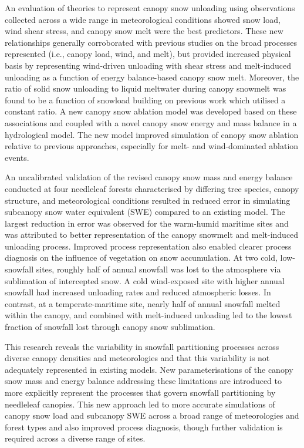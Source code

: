 {An evaluation of theories to represent canopy snow unloading using observations collected across a wide range in meteorological conditions showed snow load, wind shear stress, and canopy snow melt were the best predictors. These new relationships generally corroborated with previous studies on the broad processes represented (i.e., canopy load, wind, and melt), but provided increased physical basis by representing wind-driven unloading with shear stress and melt-induced unloading as a function of energy balance-based canopy snow melt. Moreover, the ratio of solid snow unloading to liquid meltwater during canopy snowmelt was found to be a function of snowload building on previous work which utilised a constant ratio. A new canopy snow ablation model was developed based on these associations and coupled with a novel canopy snow energy and mass balance in a hydrological model. The new model improved simulation of canopy snow ablation relative to previous approaches, especially for melt- and wind-dominated ablation events.

An uncalibrated validation of the revised canopy snow mass and energy balance conducted at four needleleaf forests characterised by differing tree species, canopy structure, and meteorological conditions resulted in reduced error in simulating subcanopy snow water equivalent (SWE) compared to an existing model. The largest reduction in error was observed for the warm-humid maritime sites and was attributed to better representation of the canopy snowmelt and melt-induced unloading process. Improved process representation also enabled clearer process diagnosis on the influence of vegetation on snow accumulation. At two cold, low-snowfall sites, roughly half of annual snowfall was lost to the atmosphere via sublimation of intercepted snow. A cold wind-exposed site with higher annual snowfall had increased unloading rates and reduced atmospheric losses. In contrast, at a temperate-maritime site, nearly half of annual snowfall melted within the canopy, and combined with melt-induced unloading led to the lowest fraction of snowfall lost through canopy snow sublimation.

This research reveals the variability in snowfall partitioning processes across diverse canopy densities and meteorologies and that this variability is not adequately represented in existing models. New parameterisations of the canopy snow mass and energy balance addressing these limitations are introduced to more explicitly represent the processes that govern snowfall partitioning by needleleaf canopies. This new approach led to more accurate simulations of canopy snow load and subcanopy SWE across a broad range of meteorologies and forest types and also improved process diagnosis, though further validation is required across a diverse range of sites.
}
